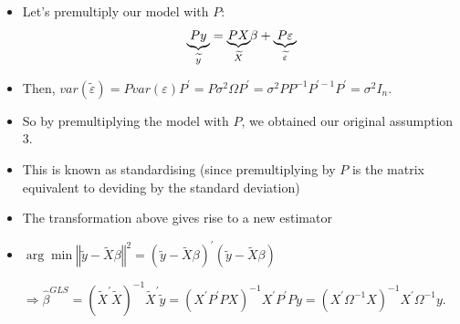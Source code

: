 \documentclass[notes=show]{beamer}
\begin{document}
\begin{frame}%


\begin{itemize}
\item Let's premultiply our model with $P:$ 
\begin{equation}
\underset{\widetilde{y}}{\underbrace{Py}}=\underset{\widetilde{X}}{%
\underbrace{PX}}\beta +\underset{\widetilde{\varepsilon }}{\underbrace{%
P\varepsilon }}  \label{transformed}
\end{equation}

\item Then, $var(\widetilde{\varepsilon })=Pvar(\varepsilon )P^{\prime
}=P\sigma ^{2}\Omega P^{\prime }=\sigma ^{2}PP^{-1}P^{\prime -1}P^{\prime
}=\sigma ^{2}I_{n}.$

\item So by premultiplying the model with $P$, we obtained our original
assumption 3.

\item This is known as standardising (since premultiplying by $P$ is the
matrix equivalent to deviding by the standard deviation)
\end{itemize}

\end{frame}%

\begin{frame}%


\begin{itemize}
\item The transformation above gives rise to a new estimator

\item $\arg \min \left\Vert \widetilde{y}-\widetilde{X}\beta \right\Vert
^{2}=(\widetilde{y}-\widetilde{X}\beta )^{\prime }(\widetilde{y}-\widetilde{X%
}\beta )$

$\Rightarrow \widehat{\beta }^{GLS}=(\widetilde{X}^{\prime }\widetilde{X}%
)^{-1}\widetilde{X}^{\prime }\widetilde{y}=(X^{\prime }P^{\prime
}PX)^{-1}X^{\prime }P^{\prime }Py=(X^{\prime }\Omega ^{-1}X)^{-1}X^{\prime
}\Omega ^{-1}y.$
\end{itemize}

\end{frame}%
\end{document}
